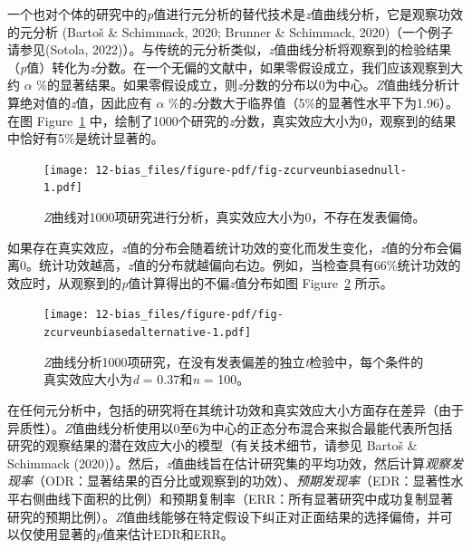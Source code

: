 \documentclass[
  letterpaper,
  DIV=11,
  numbers=noendperiod]{scrreprt}
\begin{document}
一个也对个体的研究中的\emph{p}值进行元分析的替代技术是\emph{z}值曲线分析，它是观察功效的元分析
(Bartoš \& Schimmack, 2020; Brunner \& Schimmack,
2020)（一个例子请参见(Sotola,
2022)）。与传统的元分析类似，\emph{z}值曲线分析将观察到的检验结果（\emph{p}值）转化为\emph{z}分数。在一个无偏的文献中，如果零假设成立，我们应该观察到大约
\(\alpha\)
\%的显著结果。如果零假设成立，则\emph{z}分数的分布以0为中心。\emph{Z}值曲线分析计算绝对值的\emph{z}值，因此应有
\(\alpha\) \%的\emph{z}分数大于临界值（5\%的显著性水平下为1.96）。在图
Figure~\ref{fig-zcurveunbiasednull}
中，绘制了1000个研究的\emph{z}分数，真实效应大小为0，观察到的结果中恰好有5\%是统计显著的。

\begin{figure}

{\centering \texttt{[image: 12-bias\_files/figure-pdf/fig-zcurveunbiasednull-1.pdf]}

}

\caption{\label{fig-zcurveunbiasednull}\emph{Z}曲线对1000项研究进行分析，真实效应大小为0，不存在发表偏倚。}

\end{figure}

如果存在真实效应，\emph{z}值的分布会随着统计功效的变化而发生变化，\emph{z}值的分布会偏离0。统计功效越高，\emph{z}值的分布就越偏向右边。例如，当检查具有66\%统计功效的效应时，从观察到的\emph{p}值计算得出的不偏\emph{z}值分布如图
Figure~\ref{fig-zcurveunbiasedalternative} 所示。

\begin{figure}

{\centering \texttt{[image: 12-bias\_files/figure-pdf/fig-zcurveunbiasedalternative-1.pdf]}

}

\caption{\label{fig-zcurveunbiasedalternative}\emph{Z}曲线分析1000项研究，在没有发表偏差的独立\emph{t}检验中，每个条件的真实效应大小为\emph{d}
= 0.37和\emph{n} = 100。}

\end{figure}

在任何元分析中，包括的研究将在其统计功效和真实效应大小方面存在差异（由于异质性）。\emph{Z}值曲线分析使用以0至6为中心的正态分布混合来拟合最能代表所包括研究的观察结果的潜在效应大小的模型（有关技术细节，请参见
Bartoš \& Schimmack
(2020)）。然后，\emph{z}值曲线旨在估计研究集的平均功效，然后计算\emph{观察发现率}（ODR：显著结果的百分比或观察到的功效）、\emph{预期发现率}（EDR：显著性水平右侧曲线下面积的比例）和预期复制率（ERR：所有显著研究中成功复制显著研究的预期比例）。\emph{Z}值曲线能够在特定假设下纠正对正面结果的选择偏倚，并可以仅使用显著的\emph{p}值来估计EDR和ERR。
\end{document}
